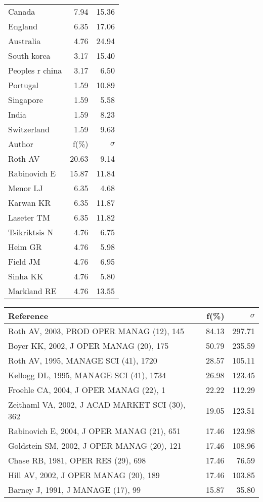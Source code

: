 \documentclass[a4paper,11pt]{report}
\begin{document}
\begin{landscape}
\begin{table}[!ht]
{\begin{tabular}{|l r r|}
Canada & 7.94 & 15.36\\
England & 6.35 & 17.06\\
Australia & 4.76 & 24.94\\
South korea & 3.17 & 15.40\\
Peoples r china & 3.17 & 6.50\\
Portugal & 1.59 & 10.89\\
Singapore & 1.59 & 5.58\\
India & 1.59 & 8.23\\
Switzerland & 1.59 & 9.63\\
\hline
\hline
Author & f(\%) & $\sigma$\\
\hline
Roth AV & 20.63 & 9.14\\
Rabinovich E & 15.87 & 11.84\\
Menor LJ & 6.35 & 4.68\\
Karwan KR & 6.35 & 11.87\\
Laseter TM & 6.35 & 11.82\\
Tsikriktsis N & 4.76 & 6.75\\
Heim GR & 4.76 & 5.98\\
Field JM & 4.76 & 6.95\\
Sinha KK & 4.76 & 5.80\\
Markland RE & 4.76 & 13.55\\
\hline
\end{tabular}
}
{\scriptsize\begin{tabular}{|l r r|}
\hline
Reference & f(\%) & $\sigma$\\
\hline
Roth AV, 2003, PROD OPER MANAG (12), 145 & 84.13 & 297.71\\
Boyer KK, 2002, J OPER MANAG (20), 175 & 50.79 & 235.59\\
Roth AV, 1995, MANAGE SCI (41), 1720 & 28.57 & 105.11\\
Kellogg DL, 1995, MANAGE SCI (41), 1734 & 26.98 & 123.45\\
Froehle CA, 2004, J OPER MANAG (22), 1 & 22.22 & 112.29\\
Zeithaml VA, 2002, J ACAD MARKET SCI (30), 362 & 19.05 & 123.51\\
Rabinovich E, 2004, J OPER MANAG (21), 651 & 17.46 & 123.98\\
Goldstein SM, 2002, J OPER MANAG (20), 121 & 17.46 & 108.96\\
Chase RB, 1981, OPER RES (29), 698 & 17.46 & 76.59\\
Hill AV, 2002, J OPER MANAG (20), 189 & 17.46 & 103.85\\
Barney J, 1991, J MANAGE (17), 99 & 15.87 & 35.80\\

\end{tabular}}
\end{table}
\end{landscape}
\end{document}
